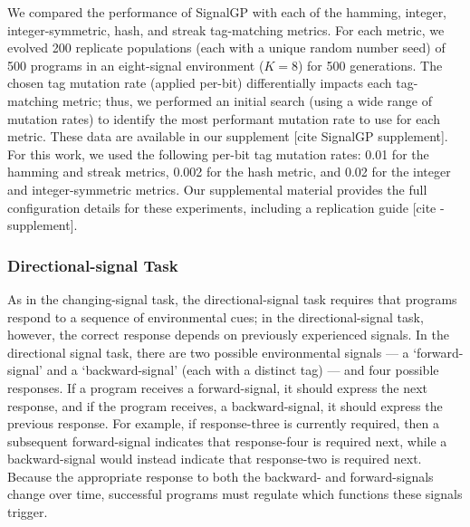 We compared the performance of SignalGP with each of the hamming, integer, integer-symmetric, hash, and streak tag-matching metrics.
For each metric, we evolved 200 replicate populations (each with a unique random number seed) of 500 programs in an eight-signal environment ($K=8$) for 500 generations.
The chosen tag mutation rate (applied per-bit) differentially impacts each tag-matching metric; thus, we performed an initial search (using a wide range of mutation rates) to identify the most performant mutation rate to use for each metric.
These data are available in our supplement [cite SignalGP supplement].
For this work, we used the following per-bit tag mutation rates: 0.01 for the hamming and streak metrics, 0.002 for the hash metric, and 0.02 for the integer and integer-symmetric metrics.
Our supplemental material provides the full configuration details for these experiments, including a replication guide [cite - supplement].

\subsubsection{Directional-signal Task}

As in the changing-signal task, the directional-signal task requires that programs respond to a sequence of environmental cues; in the directional-signal task, however, the correct response depends on previously experienced signals.
In the directional signal task, there are two possible environmental signals --- a `forward-signal' and a `backward-signal' (each with a distinct tag) ---  and four possible responses.
If a program receives a forward-signal, it should express the next response, and if the program receives, a backward-signal, it should express the previous response.
For example, if response-three is currently required, then a subsequent forward-signal indicates that response-four is required next, while a backward-signal would instead indicate that response-two is required next.
Because the appropriate response to both the backward- and forward-signals change over time, successful programs must regulate which functions these signals trigger.


